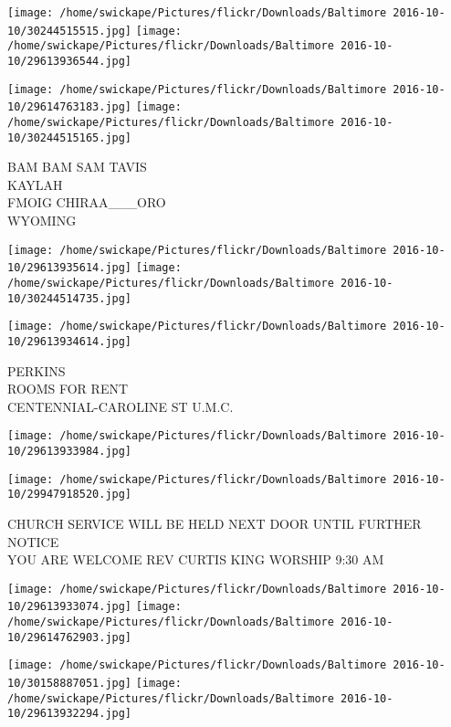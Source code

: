 \documentclass[10pt,letterpaper]{article}
\begin{document}
\texttt{[image: /home/swickape/Pictures/flickr/Downloads/Baltimore 2016-10-10/30244515515.jpg]}
\texttt{[image: /home/swickape/Pictures/flickr/Downloads/Baltimore 2016-10-10/29613936544.jpg]}

\texttt{[image: /home/swickape/Pictures/flickr/Downloads/Baltimore 2016-10-10/29614763183.jpg]}
\texttt{[image: /home/swickape/Pictures/flickr/Downloads/Baltimore 2016-10-10/30244515165.jpg]}

BAM BAM SAM TAVIS\\
KAYLAH\\
FMOIG CHIRAA\_\_\_ORO\\
WYOMING\\
\pagebreak

\texttt{[image: /home/swickape/Pictures/flickr/Downloads/Baltimore 2016-10-10/29613935614.jpg]}
\texttt{[image: /home/swickape/Pictures/flickr/Downloads/Baltimore 2016-10-10/30244514735.jpg]}

\vspace{0.25in}
\texttt{[image: /home/swickape/Pictures/flickr/Downloads/Baltimore 2016-10-10/29613934614.jpg]}

PERKINS\\
ROOMS FOR RENT\\
CENTENNIAL{-}CAROLINE ST U.M.C.\\
\pagebreak

\texttt{[image: /home/swickape/Pictures/flickr/Downloads/Baltimore 2016-10-10/29613933984.jpg]}

\vspace{0.25in}
\texttt{[image: /home/swickape/Pictures/flickr/Downloads/Baltimore 2016-10-10/29947918520.jpg]}

CHURCH SERVICE WILL BE HELD NEXT DOOR UNTIL FURTHER NOTICE\\
YOU ARE WELCOME REV CURTIS KING WORSHIP 9:30 AM\\
\pagebreak

\texttt{[image: /home/swickape/Pictures/flickr/Downloads/Baltimore 2016-10-10/29613933074.jpg]}
\texttt{[image: /home/swickape/Pictures/flickr/Downloads/Baltimore 2016-10-10/29614762903.jpg]}

\texttt{[image: /home/swickape/Pictures/flickr/Downloads/Baltimore 2016-10-10/30158887051.jpg]}
\texttt{[image: /home/swickape/Pictures/flickr/Downloads/Baltimore 2016-10-10/29613932294.jpg]}
\end{document}
